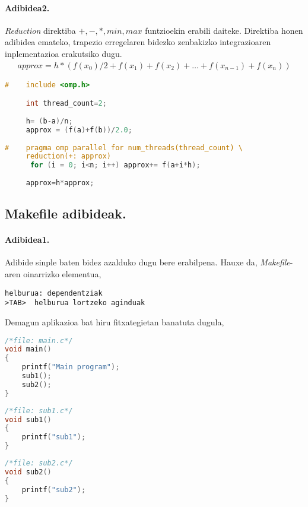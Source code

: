 \paragraph*{\textbf{Adibidea2.}} \emph{Reduction} direktiba $+,-,*,min,max$ funtzioekin erabili daiteke. Direktiba honen adibidea emateko, trapezio erregelaren bidezko zenbakizko integrazioaren inplementazioa erakutsiko dugu.
\begin{align*}
approx=h*(f(x_0)/2+f(x_1)+f(x_2)+\dots+f(x_{n-1})+f(x_{n}))
\end{align*} 

\begin{lstlisting}[language=C]
#    include <omp.h>

     int thread_count=2;
     
     h= (b-a)/n;
     approx = (f(a)+f(b))/2.0;
     
#    pragma omp parallel for num_threads(thread_count) \
     reduction(+: approx)
      for (i = 0; i<n; i++) approx+= f(a+i*h);
      
     approx=h*approx;
\end{lstlisting}

\subsection*{Makefile adibideak.}

 
\paragraph*{Adibidea1.}
Adibide sinple baten bidez azalduko dugu bere erabilpena. Hauxe da, \emph{Makefile}-aren oinarrizko elementua,
\begin{lstlisting}
helburua: dependentziak
>TAB>  helburua lortzeko aginduak
\end{lstlisting}

Demagun aplikazioa bat hiru fitxategietan banatuta dugula,
\begin{lstlisting}[language=C]
/*file: main.c*/
void main()
{
    printf("Main program");
    sub1();
    sub2();
}
\end{lstlisting}

\begin{lstlisting}[language=C]
/*file: sub1.c*/
void sub1()
{
    printf("sub1");
}
\end{lstlisting}

\begin{lstlisting}[language=C]
/*file: sub2.c*/
void sub2()
{
    printf("sub2");
}
\end{lstlisting}

